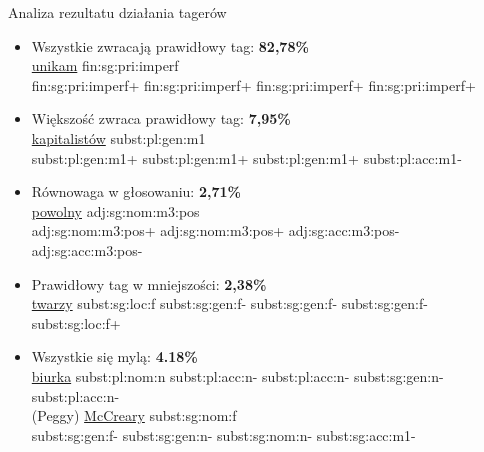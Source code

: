 \documentclass{beamer}
\newcommand{\marked}[1]{{\bf #1}}
\begin{document}
\begin{frame}{Analiza rezultatu działania tagerów}
\begin{itemize}
\item Wszystkie zwracają prawidłowy tag: \marked{82,78\%} \\
{\footnotesize \underline{unikam} fin:sg:pri:imperf\\
fin:sg:pri:imperf+ fin:sg:pri:imperf+ fin:sg:pri:imperf+ fin:sg:pri:imperf+}
\item Większość zwraca prawidłowy tag: \marked{7,95\%} \\
{\footnotesize \underline{kapitalistów} subst:pl:gen:m1 \\
subst:pl:gen:m1+ subst:pl:gen:m1+ subst:pl:gen:m1+ subst:pl:acc:m1-}
\item Równowaga w głosowaniu: \marked{2,71\%} \\
{\footnotesize \underline{powolny} adj:sg:nom:m3:pos \\
adj:sg:nom:m3:pos+ adj:sg:nom:m3:pos+ adj:sg:acc:m3:pos- adj:sg:acc:m3:pos-}
\item Prawidłowy tag w mniejszości: \marked{2,38\%} \\
{\footnotesize \underline{twarzy} subst:sg:loc:f subst:sg:gen:f- subst:sg:gen:f- subst:sg:gen:f- subst:sg:loc:f+}
\item Wszystkie się mylą: \marked{4.18\%} \\
{\footnotesize \underline{biurka} subst:pl:nom:n subst:pl:acc:n- subst:pl:acc:n- subst:sg:gen:n- subst:pl:acc:n- \\
(Peggy) \underline{McCreary} subst:sg:nom:f \\
subst:sg:gen:f- subst:sg:gen:n- subst:sg:nom:n- subst:sg:acc:m1-}
\end{itemize}
\end{frame}
\end{document}
